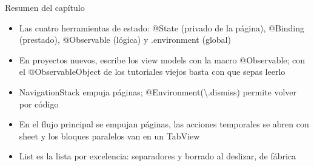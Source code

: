 \begin{tcbsummary}{Resumen del capítulo}
\begin{itemize}
  \item Las cuatro herramientas de estado: @State (privado de la página), @Binding (prestado), @Observable (lógica) y .environment (global)
  \item En proyectos nuevos, escribe los view models con la macro @Observable; con el @ObservableObject de los tutoriales viejos basta con que sepas leerlo
  \item NavigationStack empuja páginas; @Environment(\textbackslash{}.dismiss) permite volver por código
  \item En el flujo principal se empujan páginas, las acciones temporales se abren con sheet y los bloques paralelos van en un TabView
  \item List es la lista por excelencia: separadores y borrado al deslizar, de fábrica
\end{itemize}

\end{tcbsummary}
